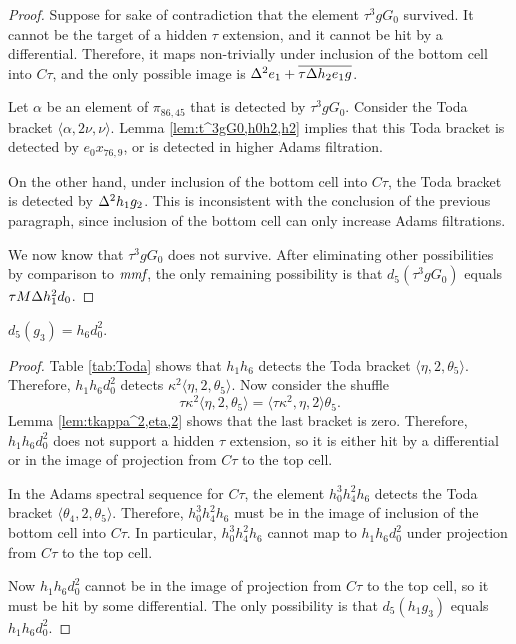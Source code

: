 \begin{proof}
Suppose for sake of contradiction that the element
$\tau^3 g G_0$ survived.
It cannot be the target of a hidden $\tau$ extension,
and it cannot be hit by a differential.
Therefore, it maps non-trivially under inclusion of the bottom
cell into $C\tau$, and the only possible image is 
$\Delta^2 e_1 + \overline{\tau \Delta h_2 e_1 g}$.

Let $\alpha$ be an element of $\pi_{86,45}$ that is detected
by $\tau^3 g G_0$.  
Consider the Toda bracket
$\langle \alpha, 2\nu, \nu \rangle$.
Lemma \ref{lem:t^3gG0,h0h2,h2} implies that this Toda bracket
is detected by $e_0 x_{76,9}$, or is detected in higher Adams filtration.

On the other hand, 
under inclusion of the bottom cell into $C\tau$,
the Toda bracket is detected by $\Delta^2 h_1 g_2$.
This is inconsistent with the conclusion of the previous paragraph,
since inclusion of the bottom cell can only increase
Adams filtrations.

We now know that $\tau^3 g G_0$ does not survive.
After eliminating other possibilities by comparison to $\textit{mmf}$,
the only remaining possibility is that $d_5(\tau^3 g G_0)$ equals
$\tau M \Delta h_1^2 d_0$.
\end{proof}

\begin{lemma}
\label{lem:d5-g3}
$d_5(g_3) = h_6 d_0^2$.
\end{lemma}

\begin{proof}
Table \ref{tab:Toda} shows that $h_1 h_6$ detects the Toda bracket
$\langle \eta, 2, \theta_5 \rangle$.  Therefore,
$h_1 h_6 d_0^2$ detects $\kappa^2 \langle \eta, 2, \theta_5 \rangle$.
Now consider the shuffle
\[
\tau \kappa^2 \langle \eta, 2, \theta_5 \rangle =
\langle \tau \kappa^2, \eta, 2 \rangle \theta_5.
\]
Lemma \ref{lem:tkappa^2,eta,2} shows that the last bracket is zero.
Therefore, $h_1 h_6 d_0^2$ does not support a hidden
$\tau$ extension, so it is either hit by a differential or 
in the image of projection from $C\tau$ to the top cell.

In the Adams spectral sequence for $C\tau$, the element 
$h_0^3 h_4^2 h_6$ detects the Toda bracket
$\langle \theta_4, 2, \theta_5 \rangle$.
Therefore, $h_0^3 h_4^2 h_6$ must be in the image of
inclusion of the bottom cell into $C\tau$.
In particular,
$h_0^3 h_4^2 h_6$ cannot map to $h_1 h_6 d_0^2$
under projection from $C\tau$ to the top cell.

Now $h_1 h_6 d_0^2$ cannot be in the image of
projection from $C\tau$ to the top cell, so it
must be hit by some differential.
The only possibility is that $d_5(h_1 g_3)$ equals $h_1 h_6 d_0^2$.
\end{proof}

